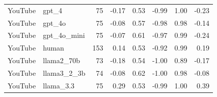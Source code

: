 \begin{table}
\begin{tabular}[t]{llrrrrrr}
YouTube & gpt\_4 & 75 & -0.17 & 0.53 & -0.99 & 1.00 & -0.23\\
YouTube & gpt\_4o & 75 & -0.08 & 0.57 & -0.98 & 0.98 & -0.14\\
YouTube & gpt\_4o\_mini & 75 & -0.07 & 0.61 & -0.97 & 0.99 & -0.24\\
YouTube & human & 153 & 0.14 & 0.53 & -0.92 & 0.99 & 0.19\\
\addlinespace
YouTube & llama2\_70b & 73 & -0.18 & 0.54 & -1.00 & 0.89 & -0.17\\
YouTube & llama3\_2\_3b & 74 & -0.08 & 0.62 & -1.00 & 0.98 & -0.08\\
YouTube & llama\_3.3 & 75 & 0.29 & 0.53 & -0.99 & 1.00 & 0.39\\
\bottomrule
\end{tabular}
\end{table}
